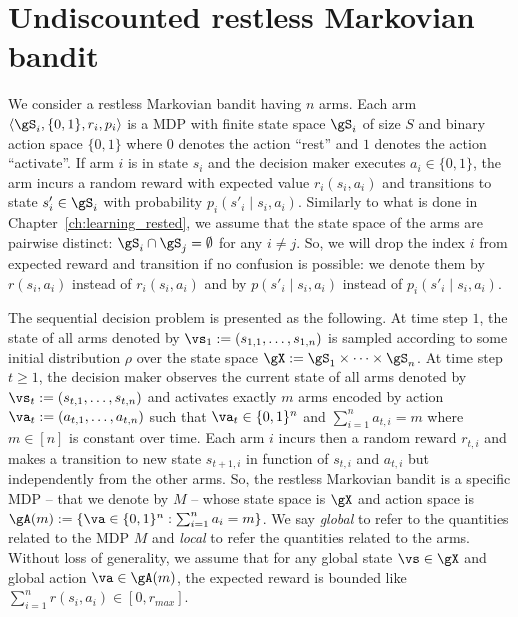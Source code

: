 \section{Undiscounted restless Markovian bandit}
\label{ch:restless:sec:restless}

We consider a restless Markovian bandit having $n$ arms.
Each arm $\langle\gS_i, \{0,1\}, r_i, p_i\rangle$ is a MDP with finite state space $\gS_i$ of size $S$ and binary action space $\{0,1\}$ where $0$ denotes the action ``rest'' and $1$ denotes the action ``activate''.
If arm $i$ is in state $s_i$ and the decision maker executes $a_i\in\{0,1\}$, the arm incurs a random reward with expected value $r_i(s_i,a_i)$ and transitions to state $s'_i\in\gS_i$ with probability $p_i(s'_i\mid s_i,a_i)$.
Similarly to what is done in Chapter~\ref{ch:learning_rested}, we assume that the state space of the arms are pairwise distinct: $\gS_i\cap\gS_j=\emptyset$ for any $i\neq j$.
So, we will drop the index $i$ from expected reward and transition if no confusion is possible: we denote them by $r(s_i,a_i)$ instead of $r_i(s_i,a_i)$ and by $p(s'_i\mid s_i,a_i)$ instead of $p_i(s'_i\mid s_i,a_i)$.

The sequential decision problem is presented as the following.
At time step $1$, the state of all arms denoted by $\vs_1:=(s_{1,1},\dots,s_{1,n})$ is sampled according to some initial distribution $\rho$ over the state space $\gX:=\gS_1\times\dots\times\gS_n$.
At time step $t\ge1$, the decision maker observes the current state of all arms denoted by $\vs_t:=(s_{t,1},\dots,s_{t,n})$ and activates exactly $m$ arms encoded by action $\va_t:=(a_{t,1},\dots,a_{t,n})$ such that $\va_t\in\{0,1\}^n$ and $\sum_{i=1}^{n} a_{t,i}=m$ where $m\in[n]$ is constant over time.
Each arm $i$ incurs then a random reward $r_{t,i}$ and makes
a transition to new state $s_{t+1,i}$ in function of $s_{t,i}$ and $a_{t,i}$ but independently from the other arms.
So, the restless Markovian bandit is a specific MDP -- that we denote by $M$ -- whose state space is $\gX$ and action space is $\gA(m):=\{\va\in\{0,1\}^n : \sum_{i=1}^{n}a_i =m\}$.
We say \emph{global} to refer to the quantities related to the MDP $M$ and \emph{local} to refer the quantities related to the arms.
Without loss of generality, we assume that for any global state $\vs\in\gX$ and global action $\va\in\gA(m)$, the expected reward is bounded like $\sum_{i=1}^{n}r(s_i,a_i)\in[0,r_{max}]$.

